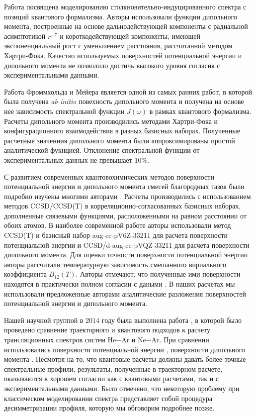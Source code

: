 Работа \cite{sharma1975} посвящена моделированию столкновительно-индуцированного спектра с позиций квантового формализма. Авторы использовали функции дипольного момента, построенные на основе дальнодействующей компоненты с радиальной асимптотикой $r^{-7}$ и короткодействующей компоненты, имеющей экспоненциальный рост с уменьшением расстояния, рассчитанной методом Хартри-Фока. Качество используемых поверхностей потенциальной энергии и дипольного момента не позволило достичь высокого уровня согласия с экспериментальными данными. \par
Работа \cite{meyer1986} Фроммхольда и Мейера является одной из самых ранних работ, в которой была получена \textit{ab initio} повехность дипольного момента и получена на основе нее зависимость спектральной функции $J(\omega)$ в рамках квантового формализма. Расчеты дипольного момента производились методами Хартри-Фока и конфигурационного взаимодействия в разных базисных наборах. Полученные расчетные значениия дипольного момента были аппроксимированы простой аналитической фукнцией. Отклонение спектральной функции от экспериментальных данных не превышает 10\%. \par 
С развитием современных квантовохимических методов поверхности потенциальной энергии и дипольного момента смесей благородных газов были подробно изучены многими авторами \cite{cybulski1999, giece2003, fernandez2004}. Расчеты производились с использованием методов CCSD/CCSD(T) в корреляционно-согласованных базисных наборах, дополненные связевыми функциями, расположенными на равном расстоянии от обоих атомов. В наиболее современной работе\cite{fernandez2004} авторы использовали метод CCSD(T) и базисный набор aug-cc-pV6Z-33211 для расчета поверхности потенциальной энергии и CCSD/d-aug-cc-pVQZ-33211 для расчета поверхности дипольного момента. Для оценки точности поверхности потенциальной энергии авторы рассчитали температурную зависимость смешанного вириального коэффициента $B_{12}(T)$. Авторы отмечают, что полученные ими поверхности находятся в практически полном согласии с даными \cite{cybulski1999}. В наших расчетах мы использовали предложенные авторами аналитические разложения поверхностей потенциальной энергии и дипольного момента. \par
Нашей научной группой в 2014 году была выполнена работа \cite{buryak2014}, в которой было проведено сравнение траекторного и квантового подходов к расчету трансляционных спектров систем He$-$Ar и Ne$-$Ar. При сравнении использовались поверхности потенциальной энергии \cite{fernandez2004}, поверхности дипольного момента \cite{fernandez2004, meyer1986}. Несмотря на то, что квантовые расчеты должны давать более точные спектральные профили, результаты, полученные в траекторном расчете, оказываются в хорошем согласии как с квантовыми расчетами, так и с экспериментальными данными. Было отмечено, что некоторую проблему при классическом моделировании спектра представляет собой процедура десимметризации профиля, которую мы обговорим подробнее позже. \par

